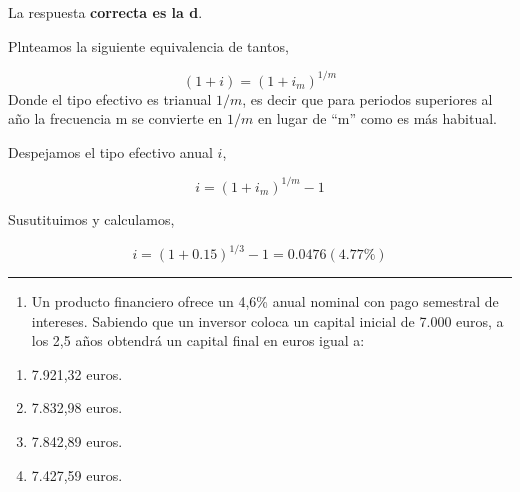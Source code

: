 \documentclass[
  letterpaper,
  DIV=11,
  numbers=noendperiod]{scrreprt}
\providecommand{\tightlist}{%
  \setlength{\itemsep}{0pt}\setlength{\parskip}{0pt}}\usepackage{longtable,booktabs,array}
\begin{document}
\begin{tcolorbox}[enhanced jigsaw, left=2mm, opacityback=0, colback=white, breakable, arc=.35mm, bottomrule=.15mm, rightrule=.15mm, toprule=.15mm, leftrule=.75mm, colframe=quarto-callout-tip-color-frame]
\begin{minipage}[t]{5.5mm}
\textcolor{quarto-callout-tip-color}{\faLightbulb}
\end{minipage}%
\begin{minipage}[t]{\textwidth - 5.5mm}

La respuesta \textbf{correcta es la d}.

Plnteamos la siguiente equivalencia de tantos,

\[\left(1+i\right)=\left(1+i_m\right)^{1/m}\] Donde el tipo efectivo es
trianual \(1/m\), es decir que para periodos superiores al año la
frecuencia m se convierte en \(1/m\) en lugar de ``m'' como es más
habitual.

Despejamos el tipo efectivo anual \(i\),

\[i=\left(1+i_m\right)^{1/m}-1\]

Susutituimos y calculamos,

\[i=\left(1+0.15\right)^{1/3}-1=0.0476(4.77\%)\]

\end{minipage}%
\end{tcolorbox}

\begin{center}\rule{0.5\linewidth}{0.5pt}\end{center}

\begin{enumerate}
\def\labelenumi{\arabic{enumi}.}
\setcounter{enumi}{24}
\tightlist
\item
  Un producto financiero ofrece un 4,6\% anual nominal con pago
  semestral de intereses. Sabiendo que un inversor coloca un capital
  inicial de 7.000 euros, a los 2,5 años obtendrá un capital final en
  euros igual a:
\end{enumerate}

\begin{enumerate}
\def\labelenumi{\alph{enumi})}
\item
  7.921,32 euros.
\item
  7.832,98 euros.
\item
  7.842,89 euros.
\item
  7.427,59 euros.
\end{enumerate}
\end{document}
